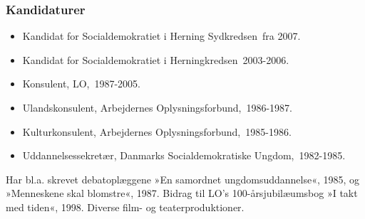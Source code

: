 \documentclass[11pt, a4paper]{awesome-cv}
\begin{document}
\begin{cvletter}
\subsubsection*{Kandidaturer}
\begin{itemize}
\item Kandidat for Socialdemokratiet i Herning Sydkredsen fra 2007.
\item Kandidat for Socialdemokratiet i Herningkredsen 2003-2006.
\end{itemize}
\begin{itemize}
\item Konsulent, LO, 1987-2005.
\item Ulandskonsulent, Arbejdernes Oplysningsforbund, 1986-1987.
\item Kulturkonsulent, Arbejdernes Oplysningsforbund, 1985-1986.
\item Uddannelsessekretær, Danmarks Socialdemokratiske Ungdom, 1982-1985.
\end{itemize}
Har bl.a. skrevet debatoplæggene »En samordnet ungdomsuddannelse«, 1985, og »Menneskene skal blomstre«, 1987. Bidrag til LO's 100-årsjubilæumsbog »I takt med tiden«, 1998. Diverse film- og teaterproduktioner.

\end{cvletter}
\end{document}
